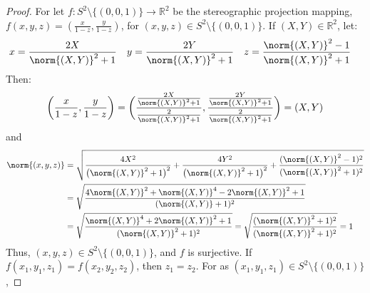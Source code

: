 \documentclass[crop=false,class=article,oneside]{standalone}
\begin{document}
        \begin{proof}
            For let
            $f:S^{2}\setminus\{(0,0,1)\}%
             \rightarrow \mathbb{R}^{2}$
            be the stereographic projection mapping,
            $f(x,y,z)=(\frac{x}{1-z},\frac{y}{1-z})$,
            for $(x,y,z)\in S^{2}\setminus\{(0,0,1)\}$.
            If $(X,Y)\in\mathbb{R}^{2}$, let:
            \begin{align*}
                x&=\frac{2X}{\norm{(X,Y)}^{2}+1}&
                y&=\frac{2Y}{\norm{(X,Y)}^{2}+1}&
                z&=\frac{\norm{(X,Y)}^{2}-1}{\norm{(X,Y)}^{2}+1} 
            \end{align*}
            Then:
            \begin{equation*}
                \bigg(\frac{x}{1-z},\frac{y}{1-z}\bigg)
                =
                \bigg(
                    \frac{\frac{2X}{\norm{(X,Y)}^{2}+ 1}}
                    {\frac{2}{\norm{(X,Y)}^{2}+1}},
                    \frac{\frac{2Y}{\norm{(X,Y)}^{2}+1}}
                    {\frac{2}{\norm{(X,Y)}^{2}+1}}
                \bigg)
                =(X,Y)    
            \end{equation*}
            and
            \begin{align*}
                \norm{(x,y,z)}
                &=\sqrt{
                    \frac{4X^{2}}
                    {\big(\norm{(X,Y)}^{2}+1\big)^{2}}
                    +
                    \frac{4Y^{2}}
                    {\big(\norm{(X,Y)}^{2}+1\big)^{2}}
                    + \frac{(\norm{(X,Y)}^{2}-1)^{2}}
                    {(\norm{(X,Y)}^{2}+1)^{2}}
                }\\
                &=\sqrt{
                    \frac{
                        4\norm{(X,Y)}^{2}
                        +\norm{(X,Y)}^{4}
                        -2\norm{(X,Y)}^{2}+1}
                    {(\norm{(X,Y)}+1)^{2}}
                }\\
                &=\sqrt{
                    \frac{\norm{(X,Y)}^{4}+2\norm{(X,Y)}^{2}+1}
                    {(\norm{(X,Y)}^{2}+1)^{2}}
                }
                =\sqrt{
                    \frac{(\norm{(X,Y)}^{2}+1)^{2}}
                    {(\norm{(X,Y)}^{2}+1)^{2}}
                }
                =1
            \end{align*}
            Thus, $(x,y,z)\in S^{2}\setminus\{(0,0,1)\}$,
            and $f$ is surjective.
            If $f(x_{1},y_{1},z_{1})=f(x_{2},y_{2},z_{2})$,
            then $z_{1}=z_{2}$.
            For as
            $(x_{1},y_{1},z_{1})\in S^{2}\setminus\{(0,0,1)\}$,

\end{proof}
\end{document}
